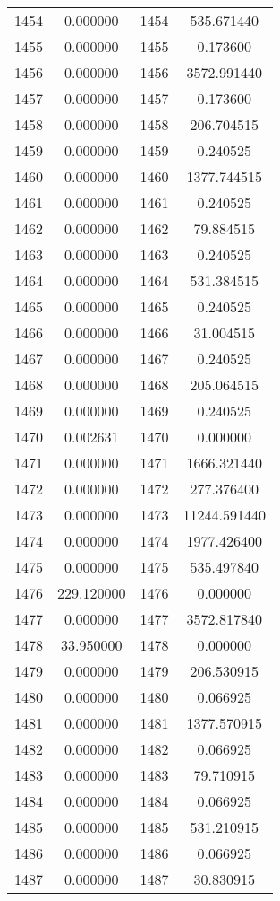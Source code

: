 \documentclass[12pt]{article}
\begin{document}
\begin{longtable}{@{}cccc@{}}
1454 & 0.000000 & 1454 & 535.671440 \\
1455 & 0.000000 & 1455 & 0.173600 \\
1456 & 0.000000 & 1456 & 3572.991440 \\
1457 & 0.000000 & 1457 & 0.173600 \\
1458 & 0.000000 & 1458 & 206.704515 \\
1459 & 0.000000 & 1459 & 0.240525 \\
1460 & 0.000000 & 1460 & 1377.744515 \\
1461 & 0.000000 & 1461 & 0.240525 \\
1462 & 0.000000 & 1462 & 79.884515 \\
1463 & 0.000000 & 1463 & 0.240525 \\
1464 & 0.000000 & 1464 & 531.384515 \\
1465 & 0.000000 & 1465 & 0.240525 \\
1466 & 0.000000 & 1466 & 31.004515 \\
1467 & 0.000000 & 1467 & 0.240525 \\
1468 & 0.000000 & 1468 & 205.064515 \\
1469 & 0.000000 & 1469 & 0.240525 \\
1470 & 0.002631 & 1470 & 0.000000 \\
1471 & 0.000000 & 1471 & 1666.321440 \\
1472 & 0.000000 & 1472 & 277.376400 \\
1473 & 0.000000 & 1473 & 11244.591440 \\
1474 & 0.000000 & 1474 & 1977.426400 \\
1475 & 0.000000 & 1475 & 535.497840 \\
1476 & 229.120000 & 1476 & 0.000000 \\
1477 & 0.000000 & 1477 & 3572.817840 \\
1478 & 33.950000 & 1478 & 0.000000 \\
1479 & 0.000000 & 1479 & 206.530915 \\
1480 & 0.000000 & 1480 & 0.066925 \\
1481 & 0.000000 & 1481 & 1377.570915 \\
1482 & 0.000000 & 1482 & 0.066925 \\
1483 & 0.000000 & 1483 & 79.710915 \\
1484 & 0.000000 & 1484 & 0.066925 \\
1485 & 0.000000 & 1485 & 531.210915 \\
1486 & 0.000000 & 1486 & 0.066925 \\
1487 & 0.000000 & 1487 & 30.830915 \\

\end{longtable}
\end{document}
